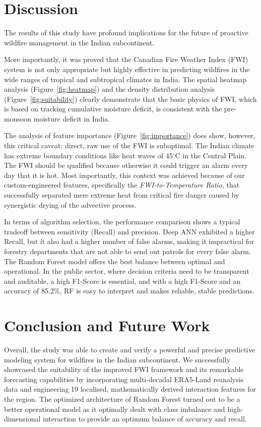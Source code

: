 \documentclass[journal, 10pt, twocolumn]{IEEEtran}
\begin{document}
\section{Discussion}

The results of this study have profound implications for the future of proactive wildfire management in the Indian subcontinent.

More importantly, it was proved that the Canadian Fire Weather Index (FWI) system is not only appropriate but highly effective in predicting wildfires in the wide ranges of tropical and subtropical climates in India. The spatial heatmap analysis (Figure~\ref{fig:heatmap}) and the density distribution analysis (Figure~\ref{fig:suitability}) clearly demonstrate that the basic physics of FWI, which is based on tracking cumulative moisture deficit, is consistent with the pre-monsoon moisture deficit in India.

The analysis of feature importance (Figure~\ref{fig:importance}) does show, however, this critical caveat: direct, raw use of the FWI is suboptimal. The Indian climate has extreme boundary conditions like heat waves of 45$^\circ$C in the Central Plain. The FWI should be qualified because otherwise it could trigger an alarm every day that it is hot. Most importantly, this context was achieved because of our custom-engineered features, specifically the \textit{FWI-to-Temperature Ratio}, that successfully separated mere extreme heat from critical fire danger caused by synergistic drying of the advective process.

In terms of algorithm selection, the performance comparison shows a typical tradeoff between sensitivity (Recall) and precision. Deep ANN exhibited a higher Recall, but it also had a higher number of false alarms, making it impractical for forestry departments that are not able to send out patrols for every false alarm. The Random Forest model offers the best balance between optimal and operational. In the public sector, where decision criteria need to be transparent and auditable, a high F1-Score is essential, and with a high F1-Score and an accuracy of 85.2\%, RF is easy to interpret and makes reliable, stable predictions.

\section{Conclusion and Future Work}

Overall, the study was able to create and verify a powerful and precise predictive modeling system for wildfires in the Indian subcontinent. We successfully showcased the suitability of the improved FWI framework and its remarkable forecasting capabilities by incorporating multi-decadal ERA5-Land reanalysis data and engineering 19 localised, mathematically derived interaction features for the region. The optimized architecture of Random Forest turned out to be a better operational model as it optimally dealt with class imbalance and high-dimensional interaction to provide an optimum balance of accuracy and recall.
\end{document}
